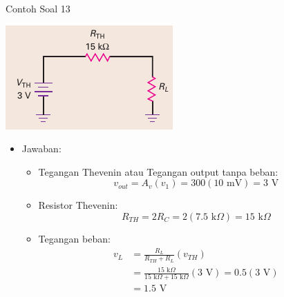 \documentclass[aspectratio=169]{beamer}
\begin{document}
\begin{frame}{Contoh Soal 13}
	\begin{multicols}{2}
		\begin{center}
			\includegraphics[height=0.4\textheight]{gambar/01.fig32b}
		\end{center}
		
		\begin{itemize}
			\item Jawaban:
			\begin{itemize}
				\item Tegangan Thevenin atau Tegangan output tanpa beban:
				\[ v_{out} = A_v(v_1) = 300 (10 \text{ mV}) = 3 \text{ V} \]
				\item Resistor Thevenin:
				\[ R_{TH} = 2R_C = 2(7.5 \text{ k}\Omega) = 15 \text{ k}\Omega \]
				\item Tegangan beban:
				\begin{align*}
					v_L &= \frac{R_L}{R_{TH} + R_L}(v_{TH}) \\
					&= \frac{15 \text{ k}\Omega}{15 \text{ k}\Omega + 15 \text{ k}\Omega}(3 \text{ V}) = 0.5(3 \text{ V}) \\
					&= 1.5 \text{ V}
				\end{align*}
			\end{itemize}
		\end{itemize}
		\vfill\null
	\end{multicols}
\end{frame}
\end{document}
